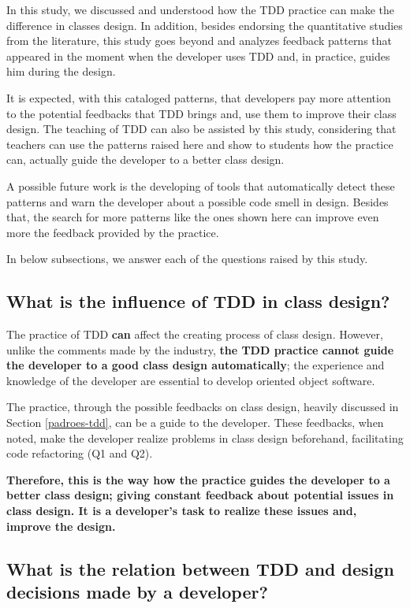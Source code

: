 \documentclass[times]{elsarticle}
\begin{document}
In this study, we discussed and understood how the TDD practice can make the
difference in classes design.
In addition, besides endorsing the quantitative studies from the literature, this study
goes beyond and analyzes feedback patterns that appeared in the moment when
the developer uses TDD and, in practice, guides him during the design.

It is expected, with this cataloged patterns, that developers pay more attention
to the potential feedbacks that TDD brings and, use them to improve their class
design. The teaching of TDD can also be assisted by this study, considering
that teachers can use the patterns raised here and show to students
how the practice can, actually guide the developer to a better class design.


A possible future work is the developing of tools that automatically detect these patterns
and warn the developer about a possible code smell in design. Besides that,
the search for more patterns like the ones shown here can improve even more the feedback
provided by the practice.

In below subsections, we answer each of the questions raised by this study.

\subsection{What is the influence of TDD in class design?}

The practice of TDD \textbf{can} affect the creating process of class design. However,
unlike the comments made by the industry, \textbf{the TDD practice cannot guide the
developer to a good class design automatically}; the experience and knowledge of
the developer are essential to develop oriented object software.

The practice, through the possible feedbacks on class design, heavily
discussed in Section \ref{padroes-tdd}, can be a guide to the developer.
These feedbacks, when noted, make the developer realize problems in class
design beforehand, facilitating code refactoring (Q1 and Q2).

\textbf{Therefore, this is the way how the practice guides the developer to
a better class design; giving constant feedback about potential issues in
class design. It is a developer's task to realize these issues and, 
improve the design. }

\subsection{What is the relation between TDD and design decisions made by
a developer?}
\end{document}

